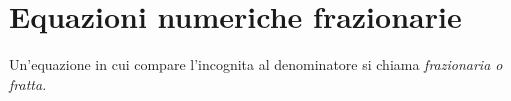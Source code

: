 % 
% 

\section{Equazioni numeriche frazionarie}
\label{sec:eq2gr_frazionarie}

Un'equazione in cui compare l'incognita al denominatore si chiama 
\emph{frazionaria o fratta.}

